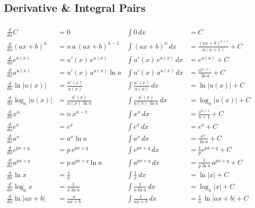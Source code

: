 \documentclass{article}
\begin{document}
\newpage
\newpage
\begin{multicols}{2}
\section*{Derivative \& Integral Pairs}

\begin{align*}
\\[10pt]
\frac{d}{dx}C &= 0
&\int 0\,dx &= C
\\[6pt]
\frac{d}{dx}(a x + b)^n &= n\,a\,(a x + b)^{n-1}
&\int (a x + b)^n\,dx &= \frac{(a x + b)^{n+1}}{a(n+1)} + C
\\[10pt]
\frac{d}{dx}e^{u(x)} &= u'(x)\,e^{u(x)}
&\int u'(x)\,e^{u(x)}\,dx &= e^{u(x)} + C
\\[6pt]
\frac{d}{dx}a^{u(x)} &= u'(x)\,a^{u(x)}\ln a
&\int u'(x)\,a^{u(x)}\,dx &= \frac{a^{u(x)}}{\ln a} + C
\\[10pt]
\frac{d}{dx}\ln\lvert u(x)\rvert &= \frac{u'(x)}{u(x)}
&\int \frac{u'(x)}{u(x)}\,dx &= \ln\lvert u(x)\rvert + C
\\[6pt]
\frac{d}{dx}\log_a\lvert u(x)\rvert &= \frac{u'(x)}{u(x)\,\ln a}
&\int \frac{u'(x)}{u(x)\,\ln a}\,dx &= \log_a\lvert u(x)\rvert + C
\\[10pt]
\frac{d}{dx}x^n &= n\,x^{n-1}
&\int x^n\,dx &= \frac{x^{n+1}}{n+1} + C
\\[6pt]
\frac{d}{dx}e^x &= e^x
&\int e^x\,dx &= e^x + C
\\[6pt]
\frac{d}{dx}a^x &= a^x\ln a
&\int a^x\,dx &= \frac{a^x}{\ln a} + C
\\[6pt]
\frac{d}{dx}e^{p x+q} &= p\,e^{p x+q}
&\int e^{p x+q}\,dx &= \frac{1}{p}e^{p x+q} + C
\\[6pt]
\frac{d}{dx}a^{p x+q} &= p\,a^{p x+q}\ln a
&\int a^{p x+q}\,dx &= \frac{1}{p\ln a}\,a^{p x+q} + C
\\[6pt]
\frac{d}{dx}\ln x &= \tfrac1x
&\int \tfrac{1}{x}\,dx &= \ln\lvert x\rvert + C
\\[6pt]
\frac{d}{dx}\log_a x &= \frac{1}{x\ln a}
&\int \frac{1}{x\ln a}\,dx &= \log_a\lvert x\rvert + C
\\[6pt]
\frac{d}{dx}\ln\lvert a x + b\rvert &= \frac{a}{a x + b}
&\int \frac{1}{a x + b}\,dx &= \frac{1}{a}\,\ln\lvert a x + b\rvert + C
\\[10pt]
\end{align*}
\end{multicols}
\end{document}
